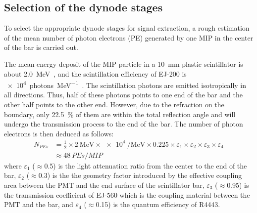 \documentclass[preprint, times]{elsarticle}
\begin{document}
\subsection{Selection of the dynode stages}
\label{sec:dynodes_selection}
To select the appropriate dynode stages for signal extraction, a rough estimation of the mean number of photon electrons (PE) generated by one MIP in the center of the bar is carried out.

The mean energy deposit of the MIP particle in a \SI{10}{\milli\meter} plastic scintillator is about \SI{2.0}{\mega\electronvolt}~\cite{olive_review_2014}, and the scintillation efficiency of EJ-200 is \SI[per-mode=symbol]{e4}{photons\per\mega\electronvolt}~\cite{scintillator}.
The scintillation photons are emitted isotropically in all directions.
Thus, half of these photons points to one end of the bar and the other half points to the other end.
However, due to the refraction on the boundary, only \SI{22.5}{\percent} of them are within the total reflection angle and will undergo the transmission process to the end of the bar.
The number of photon electrons is then deduced as follows:
\begin{align}
 N_{PEs} &= \frac{1}{2} \times \SI[per-mode=symbol]{2}{\mega\electronvolt} \times \SI{e4}{\per\mega\electronvolt} \times 0.225
           \times \varepsilon_{1} \times \varepsilon_{2} \times \varepsilon_{3} \times \varepsilon_{4} \nonumber \\
         &\approx \SI{48}{PEs\per{MIP}}
\label{eq:pes}
\end{align}
where $\varepsilon_1$ ($\approx$0.5) is the light attenuation ratio from the center to the end of the bar,
$\varepsilon_2$ ($\approx$0.3) is the the geometry factor introduced by the effective coupling area between the PMT and the end surface of the scintillator bar,
$\varepsilon_3$ ($\approx$0.95) is the transmission coefficient of EJ-560 which is the coupling material between the PMT and the bar,
and $\varepsilon_4$ ($\approx$0.15) is the quantum efficiency of R4443.
\end{document}
